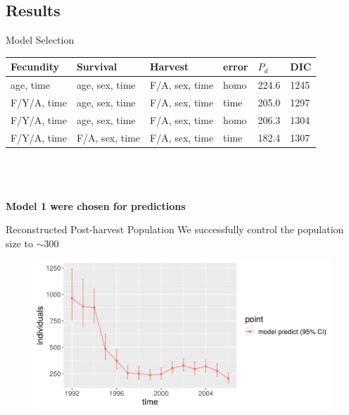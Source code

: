 \documentclass{beamer}
\begin{document}
\subsection{Results}

\begin{frame}{Model Selection}
\renewcommand\baselinestretch{1.5}\selectfont
\begin{tabular}{ l l l l l  l}
	\toprule
	 Fecundity & Survival & Harvest & error  & $P_d$ & DIC \\ 
	\midrule
	 age, time  &  age, sex, time & F/A, sex, time & homo &224.6&1245\\ 
	 F/Y/A, time & age, sex, time & F/A, sex, time & time &205.0&1297 \\
	 F/Y/A, time & age, sex, time & F/A, sex, time & homo &206.3&1304 \\
	 F/Y/A, time & F/A, sex, time & F/A, sex, time & time &182.4&1307 \\
	\bottomrule
\end{tabular}\pause
\renewcommand\baselinestretch{1}\selectfont
\\
\\
\\
\textbf{Model 1 were chosen for predictions}
\end{frame}


\begin{frame}{Reconstructed Post-harvest Population}
We successfully control the population size to $\sim 300$
	\begin{figure}[ht]
		\centering
		\includegraphics[width=\textwidth]{fig/Chicago_deer/post_harvest_popu.jpg}
		\label{postcull}
	\end{figure}
\end{frame}
\end{document}

